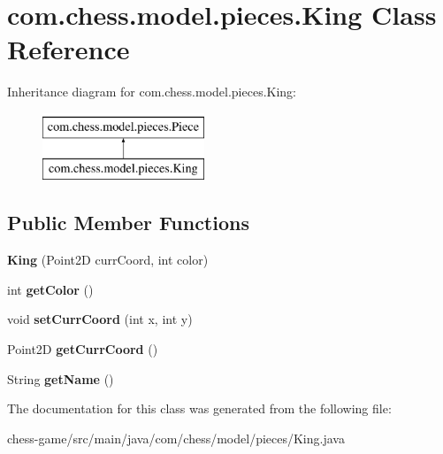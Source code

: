 \hypertarget{classcom_1_1chess_1_1model_1_1pieces_1_1_king}{}\section{com.\+chess.\+model.\+pieces.\+King Class Reference}
\label{classcom_1_1chess_1_1model_1_1pieces_1_1_king}
Inheritance diagram for com.\+chess.\+model.\+pieces.\+King\+:\begin{figure}[H]
\begin{center}
\leavevmode
\includegraphics[height=2.000000cm]{classcom_1_1chess_1_1model_1_1pieces_1_1_king}
\end{center}
\end{figure}
\subsection*{Public Member Functions}
\begin{DoxyCompactItemize}
\item 
\mbox{\label{classcom_1_1chess_1_1model_1_1pieces_1_1_king_ab6fce07954a8f0dc8bb66eec8b70a8c0}} 
{\bfseries King} (Point2D curr\+Coord, int color)
\item 
\mbox{\label{classcom_1_1chess_1_1model_1_1pieces_1_1_king_aa005c4fb5bc814d731fbb422ee58d016}} 
int {\bfseries get\+Color} ()
\item 
\mbox{\label{classcom_1_1chess_1_1model_1_1pieces_1_1_king_a76e6b042036a0802291895b80e16499a}} 
void {\bfseries set\+Curr\+Coord} (int x, int y)
\item 
\mbox{\label{classcom_1_1chess_1_1model_1_1pieces_1_1_king_adea994dcb8d01e8b3609e8164499f190}} 
Point2D {\bfseries get\+Curr\+Coord} ()
\item 
\mbox{\label{classcom_1_1chess_1_1model_1_1pieces_1_1_king_a4682c39eb62c5777bd09099aef056ced}} 
String {\bfseries get\+Name} ()
\end{DoxyCompactItemize}


The documentation for this class was generated from the following file\+:\begin{DoxyCompactItemize}
\item 
chess-\/game/src/main/java/com/chess/model/pieces/King.\+java\end{DoxyCompactItemize}
